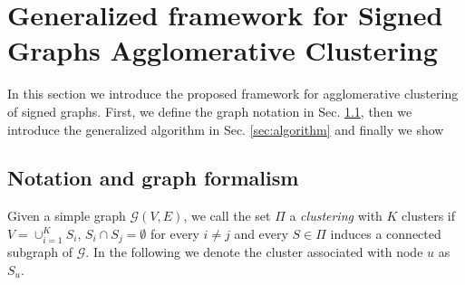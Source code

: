 \begin{minipage}[t]{\textwidth}
\begin{minipage}[t]{0.49\textwidth}
    \end{minipage}
\end{minipage}


\section{Generalized framework for Signed Graphs Agglomerative Clustering}
In this section we introduce the proposed framework for agglomerative clustering of signed graphs. 
First, we define the graph notation in Sec. \ref{sec:notation}, then we introduce the generalized algorithm in Sec. \ref{sec:algorithm} and finally we show 

\subsection{Notation and graph formalism} \label{sec:notation}

Given a simple graph $\mathcal{G}(V,E)$, we call the set $\Pi$ a \emph{clustering} with $K$ clusters if $V = \cup_{i=1}^K S_i $, $S_i \cap S_j = \emptyset$ for every $i\neq j$ and every $S \in \Pi$ induces a connected subgraph of $\mathcal{G}$. In the following we denote the cluster associated with node $u$ as $S_u$.

